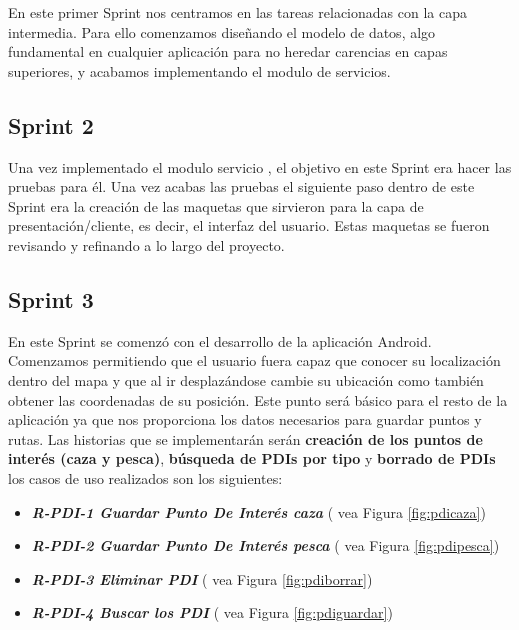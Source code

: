 En este primer Sprint nos centramos en las tareas relacionadas con la capa intermedia. Para ello comenzamos diseñando el modelo de datos, algo fundamental en cualquier aplicación para no heredar carencias en capas superiores, y acabamos implementando el modulo de servicios.


\subsection{Sprint 2}
 Una vez implementado el modulo servicio , el objetivo en este Sprint era hacer las pruebas para él.
 Una vez acabas las pruebas el siguiente paso dentro de este Sprint era la creación de las maquetas que sirvieron para la capa de presentación/cliente, es decir, el interfaz del usuario. Estas maquetas se fueron revisando y refinando a lo largo del proyecto.
 
\subsection{Sprint 3}

En este Sprint se comenzó con el desarrollo de la aplicación Android. Comenzamos permitiendo que el usuario fuera capaz que conocer su localización dentro del mapa y que al ir desplazándose cambie su ubicación como también obtener las coordenadas de su posición. Este punto será básico para el resto de la aplicación ya que nos proporciona los datos necesarios para guardar puntos y rutas. Las historias que se implementarán serán \textbf{creación de los puntos de interés (caza y pesca)},\textbf{ búsqueda de PDIs por tipo} y \textbf{borrado de PDIs} los casos de uso realizados son los siguientes:

\begin{itemize}

\item\textbf{\textit{ R-PDI-1 Guardar Punto De Interés caza}}  ( vea Figura \ref{fig:pdicaza})
\item\textit{ \textbf{R-PDI-2 Guardar Punto De Interés pesca}}  ( vea Figura \ref{fig:pdipesca})
\item \textbf{\textit{R-PDI-3 Eliminar PDI}}  ( vea Figura \ref{fig:pdiborrar})
\item \textbf{\textit{R-PDI-4 Buscar los PDI}}  ( vea Figura \ref{fig:pdiguardar})
\end{itemize} 


